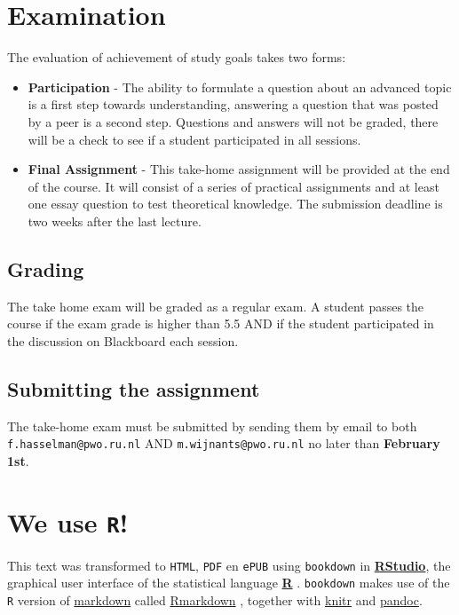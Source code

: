 \documentclass[]{book}
\providecommand{\tightlist}{%
  \setlength{\itemsep}{0pt}\setlength{\parskip}{0pt}}
\let\stdsection\section
\renewcommand\section{\newpage\stdsection}
\begin{document}
\section{Examination}\label{examination}

The evaluation of achievement of study goals takes two forms:

\begin{itemize}
\tightlist
\item
  \textbf{Participation} - The ability to formulate a question about an
  advanced topic is a first step towards understanding, answering a
  question that was posted by a peer is a second step. Questions and
  answers will not be graded, there will be a check to see if a student
  participated in all sessions.
\item
  \textbf{Final Assignment} - This take-home assignment will be provided
  at the end of the course. It will consist of a series of practical
  assignments and at least one essay question to test theoretical
  knowledge. The submission deadline is two weeks after the last
  lecture.
\end{itemize}

\subsection*{Grading}\label{grading}

The take home exam will be graded as a regular exam. A student passes
the course if the exam grade is higher than 5.5 AND if the student
participated in the discussion on Blackboard each session.

\subsection*{Submitting the assignment}\label{submitting-the-assignment}

The take-home exam must be submitted by sending them by email to both
\texttt{f.hasselman@pwo.ru.nl} AND \texttt{m.wijnants@pwo.ru.nl} no
later than \textbf{February 1st}.

\section{\texorpdfstring{We use \texttt{R}!}{We use R!}}\label{we-use-r}

This text was transformed to \texttt{HTML}, \texttt{PDF} en
\texttt{ePUB} using \texttt{bookdown}\citep{R-bookdown} in
\href{https://www.rstudio.com}{\textbf{RStudio}}, the graphical user
interface of the statistical language
\href{https://www.r-project.org}{\textbf{R}} \citep{R-base}.
\texttt{bookdown} makes use of the \texttt{R} version of
\href{https://en.wikipedia.org/wiki/Markdown}{markdown} called
\href{http://rmarkdown.rstudio.com}{Rmarkdown} \citep{R-rmarkdown},
together with \href{http://yihui.name/knitr/}{knitr} \citep{R-knitr} and
\href{http://pandoc.org}{pandoc}.
\end{document}
